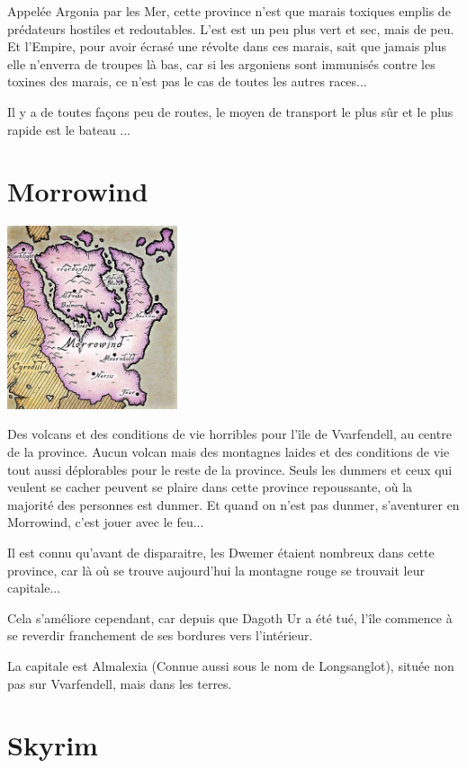 Appelée Argonia par les Mer, cette province n'est que marais toxiques emplis de prédateurs hostiles et redoutables. L'est est un peu plus vert et sec, mais de peu. Et l'Empire, pour avoir écrasé une révolte dans ces marais, sait que jamais plus elle n'enverra de troupes là bas, car si les argoniens sont immunisés contre les toxines des marais, ce n'est pas le cas de toutes les autres races...

Il y a de toutes façons peu de routes, le moyen de transport le plus sûr et le plus rapide est le bateau ...

\section{Morrowind}

\begin{center}
\includegraphics[width=5cm]{images/map_morrowind.jpg}
\end{center}

Des volcans et des conditions de vie horribles pour l'île de Vvarfendell, au centre de la province. Aucun volcan mais des montagnes laides et des conditions de vie tout aussi déplorables pour le reste de la province. Seuls les dunmers et ceux qui veulent se cacher peuvent se plaire dans cette province repoussante, où la majorité des personnes est dunmer. Et quand on n'est pas dunmer, s'aventurer en Morrowind, c'est jouer avec le feu...

Il est connu qu'avant de disparaitre, les Dwemer étaient nombreux dans cette province, car là où se trouve aujourd'hui la montagne rouge se trouvait leur capitale...

Cela s'améliore cependant, car depuis que Dagoth Ur a été tué, l'île commence à se reverdir franchement de ses bordures vers l'intérieur.

La capitale est Almalexia (Connue aussi sous le nom de Longsanglot), située non pas sur Vvarfendell, mais dans les terres.

\section{Skyrim}

